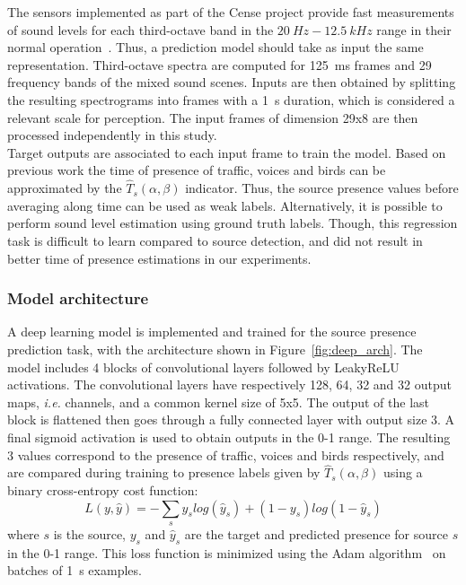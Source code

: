 \documentclass[11pt,a4paper]{article}
\begin{document}
The sensors implemented as part of the Cense project provide fast measurements of sound levels for each third-octave band in the $20~Hz - 12.5~kHz$ range in their normal operation~\cite{ardouin2018, gontier2017}. Thus, a prediction model should take as input the same representation. Third-octave spectra are computed for 125~ms frames and 29 frequency bands of the mixed sound scenes. Inputs are then obtained by splitting the resulting spectrograms into frames with a 1~s duration, which is considered a relevant scale for perception. The input frames of dimension 29x8 are then processed independently in this study.\\

Target outputs are associated to each input frame to train the model. Based on previous work the time of presence of traffic, voices and birds can be approximated by the $\hat T_s(\alpha, \beta)$ indicator. Thus, the source presence values before averaging along time can be used as weak labels. Alternatively, it is possible to perform sound level estimation using ground truth labels. Though, this regression task is difficult to learn compared to source detection, and did not result in better time of presence estimations in our experiments.

\subsubsection{Model architecture}
\label{sec:deep_mdl}

A deep learning model is implemented and trained for the source presence prediction task, with the architecture shown in Figure~\ref{fig:deep_arch}. The model includes 4 blocks of convolutional layers followed by LeakyReLU activations. The convolutional layers have respectively 128, 64, 32 and 32 output maps, \textit{i.e.} channels, and a common kernel size of 5x5. The output of the last block is flattened then goes through a fully connected layer with output size 3. A final sigmoid activation is used to obtain outputs in the 0-1 range. The resulting 3 values correspond to the presence of traffic, voices and birds respectively, and are compared during training to presence labels given by $\hat T_s(\alpha, \beta)$ using a binary cross-entropy cost function:
\begin{equation}
L(y, \hat y) = -\sum_s y_s log\left(\hat y_s\right) + (1-y_s) log\left(1-\hat y_s\right)
\end{equation}
where $s$ is the source, $y_s$ and $\hat y_s$ are the target and predicted presence for source $s$ in the 0-1 range. This loss function is minimized using the Adam algorithm~\cite{kingma2015} on batches of 1~s examples.\\
\end{document}

